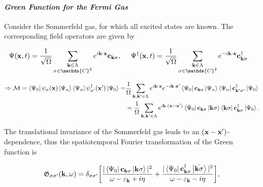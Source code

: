 \documentclass{homework}
\begin{document}
\paragraph{\textit{Green Function for the Fermi Gas}}

Consider the Sommerfeld gas, for which all excited states 
are known. The corresponding field operators are given by

\begin{equation} \begin{split}
    &\Psi({\bf x}, t) = \frac{1}{\sqrt{\Omega}} \sum_{\substack{{\bf k} \in \Lambda \\
    \sigma \in \mathds{C}^2}} e^{i {\bf k} \cdot {\x}} {\bf c}_{{\bf k} \sigma}, \blanky \blanky \blanky \blanky 
    \Psi^\dagger({\bf x}, t) = \frac{1}{\sqrt{\Omega}} \sum_{\substack{{\bf k} \in \Lambda \\
    \sigma \in \mathds{C}^2}} e^{-i {\bf k} \cdot {\x}} {\bf c}_{{\bf k} \sigma}^\dagger
    \end{split}
\end{equation}

\begin{equation}
    \begin{split}
    \Rightarrow \mathcal{M} = \bra{\Psi_0} \psi_{\sigma}({\bf x}) \ket{\Psi_n} \bra{\Psi_n} \psi_{\sigma'}^\dagger({\bf x}') \ket{\Psi_0} = & \frac{1}{\Omega} \sum_{{\bf k}, {\bf k}' \in \Lambda} e^{i {\bf k} \cdot {\bf x}} e^{-i {\bf k} \cdot {\bf x}'} \bra{\Psi_0} {{\bf c}}_{{\bf k} \sigma} \ket{\Psi_n} \bra{\Psi_n} {{\bf c}}_{{\bf k}' \sigma'}^\dagger \ket{\Psi_0} \\
    & = \frac{1}{\Omega} \sum_{{\bf k}, {\bf k}' \in \Lambda} e^{i {\bf k} \cdot ({\bf x}-{\bf x}')} \bra{\Psi_0} {{\bf c}}_{{\bf k} \sigma} \ket{{\bf k} \sigma} \bra{{\bf k} \sigma} {{\bf c}}_{{\bf k} \sigma}^\dagger \ket{\Psi_0}.
    \end{split}
\end{equation}

The translational invariance of the Sommerfeld gas leads to an $({\bf x}-{\bf x}')$-dependence, thus the spatiotemporal Fourier transformation of the Green function is 

\begin{equation}
    \mathfrak{G}_{\sigma \sigma'} ({\bf k}, \omega) = \delta_{\sigma \sigma'} \bigg[\frac{|\bra{\Psi_0} {{\bf c}}_{{\bf k} \sigma} \ket{{\bf k} \sigma}|^2}{\omega - \varepsilon_{\bf k} + i\eta} + \frac{|\bra{\Psi_0} {{\bf c}}^\dagger_{{\bf k} \sigma} \ket{\bar{{\bf k} \sigma}}|^2}{\omega - \varepsilon_{\bf k} - i\eta}\bigg],
\end{equation}
\end{document}
